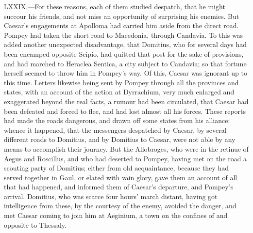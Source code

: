 LXXIX.—For these reasons, each of them studied despatch, that he might
succour his friends, and not miss an opportunity of surprising his
enemies. But Caesar's engagements at Apolloma had carried him aside from
the direct road. Pompey had taken the short road to Macedonia, through
Candavia. To this was added another unexpected disadvantage, that
Domitius, who for several days had been encamped opposite Scipio, had
quitted that post for the sake of provisions, and had marched to
Heraclea Sentica, a city subject to Candavia; so that fortune herself
seemed to throw him in Pompey's way. Of this, Caesar was ignorant up to
this time. Letters likewise being sent by Pompey through all the
provinces and states, with an account of the action at Dyrrachium, very
much enlarged and exaggerated beyond the real facts, a rumour had been
circulated, that Caesar had been defeated and forced to flee, and had
lost almost all his forces. These reports had made the roads dangerous,
and drawn off some states from his alliance: whence it happened, that
the messengers despatched by Caesar, by several different roads to
Domitius, and by Domitius to Caesar, were not able by any means to
accomplish their journey. But the Allobroges, who were in the retinue of
Aegus and Roscillus, and who had deserted to Pompey, having met on the
road a scouting party of Domitius; either from old acquaintance, because
they had served together in Gaul, or elated with vain glory, gave them
an account of all that had happened, and informed them of Caesar's
departure, and Pompey's arrival. Domitius, who was scarce four hours'
march distant, having got intelligence from these, by the courtesy of
the enemy, avoided the danger, and met Caesar coming to join him at
Aeginium, a town on the confines of and opposite to Thessaly.

